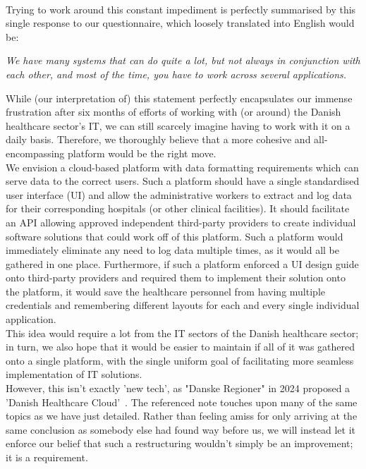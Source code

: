 \\
Trying to work around this constant impediment is perfectly summarised by this single response to our questionnaire, which loosely translated into English would be:
\begin{center}
 \textit{We have many systems that can do quite a lot, but not always in conjunction with each other, and most of the time, you have to work across several applications.}
\end{center}
While (our interpretation of) this statement perfectly encapsulates our immense frustration after six months of efforts of working with (or around) the Danish healthcare sector's IT, we can still scarcely imagine having to work with it on a daily basis. Therefore, we thoroughly believe that a more cohesive and all-encompassing platform would be the right move.
\\
We envision a cloud-based platform with data formatting requirements which can serve data to the correct users. Such a platform should have a single standardised user interface (UI) and allow the administrative workers to extract and log data for their corresponding hospitals (or other clinical facilities). It should facilitate an API allowing approved independent third-party providers to create individual software solutions that could work off of this platform. Such a platform would immediately eliminate any need to log data multiple times, as it would all be gathered in one place. Furthermore, if such a platform enforced a UI design guide onto third-party providers and required them to implement their solution onto the platform, it would save the healthcare personnel from having multiple credentials and remembering different layouts for each and every single individual application.
\\
This idea would require a lot from the IT sectors of the Danish healthcare sector; in turn, we also hope that it would be easier to maintain if all of it was gathered onto a single platform, with the single uniform goal of facilitating more seamless implementation of IT solutions.
\\
However, this isn't exactly 'new tech', as "Danske Regioner" in 2024 proposed a 'Danish Healthcare Cloud'~\cite{Den-Reg-digitalisation}. The referenced note touches upon many of the same topics as we have just detailed. Rather than feeling amiss for only arriving at the same conclusion as somebody else had found way before us, we will instead let it enforce our belief that such a restructuring wouldn't simply be an improvement; it is a requirement.
